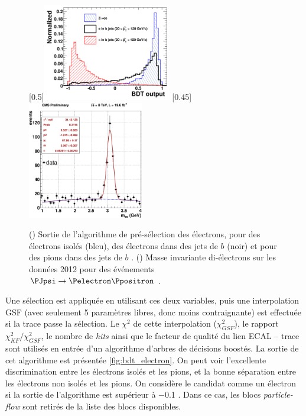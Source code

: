 \begin{figure}[tbp]
    \centering
    \subcaptionbox{\label{fig:bdt_electron}}[0.5\textwidth]{\includegraphics[width=0.5\textwidth]{chapitre3/figs/bdt_electron.pdf}} \hfill
    \subcaptionbox{\label{fig:jspi_ee}}[0.45\textwidth]{\includegraphics[width=0.45\textwidth]{chapitre3/figs/jspi_ee.pdf}}
    \caption{() Sortie de l'algorithme de pré-sélection des électrons, pour des électrons isolés (bleu), des électrons dans des jets de $b$ (noir) et pour des pions dans des jets de $b$ \citep{pf}. () Masse invariante di-électrons sur les données 2012 pour des événements $\PJpsi \rightarrow \Pelectron \Ppositron$ \citep{cms_electron_perf}.}
    \label{fig:electron_perf}
\end{figure}

Une sélection est appliquée en utilisant ces deux variables, puis une interpolation GSF (avec seulement 5 paramètres libres, donc moins contraignante) est effectuée si la trace passe la sélection. Le $\chi^2$ de cette interpolation ($\chi^2_{GSF}$), le rapport $\chi^2_{KF} / \chi^2_{GSF}$, le nombre de \emph{hits} ainsi que le facteur de qualité du lien ECAL -- trace sont utilisés en entrée d'un algorithme d'arbres de décisions boostés. La sortie de cet algorithme est présentée \cref{fig:bdt_electron}. On peut voir l'excellente discrimination entre les électrons isolés et les pions, et la bonne séparation entre les électrons non isolés et les pions. On considère le candidat comme un électron si la sortie de l'algorithme est supérieur à \num{-0.1} \citep{cms_pf_electrons}. Dans ce cas, les blocs \emph{particle-flow} sont retirés de la liste des blocs disponibles.

